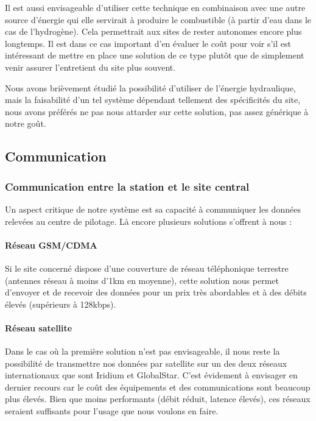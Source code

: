 Il est aussi envisageable d’utiliser cette technique en combinaison avec une autre source d’énergie qui elle servirait à produire le combustible (à partir d’eau dans le cas de l’hydrogène). Cela permettrait aux sites de rester autonomes encore plus longtemps. Il est dans ce cas important d’en évaluer le coût pour voir s’il est intéressant de mettre en place une solution de ce type plutôt que de simplement venir assurer l’entretient du site plus souvent.

Nous avons brièvement étudié la possibilité d’utiliser de l’énergie hydraulique, mais la faisabilité d’un tel système dépendant tellement des spécificités du site, nous avons préférés ne pas nous attarder sur cette solution, pas assez générique à notre goût.

\subsection{Communication}

\subsubsection{Communication entre la station et le site central}

Un aspect critique de notre système est sa capacité à communiquer les données relevées au centre de pilotage. Là encore plusieurs solutions s’offrent à nous :

\paragraph{Réseau GSM/CDMA}

Si le site concerné dispose d’une couverture de réseau téléphonique terrestre (antennes réseau à moins d’1km en moyenne), cette solution nous permet d’envoyer et de recevoir des données pour un prix très abordables et à des débits élevés (supérieurs à 128kbps).

\paragraph{Réseau satellite}

Dans le cas où la première solution n’est pas envisageable, il nous reste la possibilité de transmettre nos données par satellite sur un des deux réseaux internationaux que sont Iridium et GlobalStar. C’est évidement à envisager en dernier recours car le coût des équipements et des communications sont beaucoup plus élevés. Bien que moins performants (débit réduit, latence élevés), ces réseaux seraient suffisants pour l’usage que nous voulons en faire.

